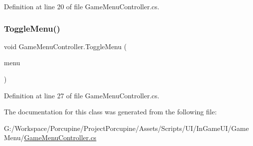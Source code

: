 Definition at line 20 of file Game\+Menu\+Controller.\+cs.

\mbox{\label{class_game_menu_controller_a591baeb9b3e7a3edb590acb91ae224af}} 
\subsubsection{\texorpdfstring{Toggle\+Menu()}{ToggleMenu()}}
{\footnotesize\ttfamily void Game\+Menu\+Controller.\+Toggle\+Menu (\begin{DoxyParamCaption}\item[{Game\+Object}]{menu }\end{DoxyParamCaption})}



Definition at line 27 of file Game\+Menu\+Controller.\+cs.



The documentation for this class was generated from the following file\+:\begin{DoxyCompactItemize}
\item 
G\+:/\+Workspace/\+Porcupine/\+Project\+Porcupine/\+Assets/\+Scripts/\+U\+I/\+In\+Game\+U\+I/\+Game\+Menu/\hyperlink{_game_menu_controller_8cs}{Game\+Menu\+Controller.\+cs}\end{DoxyCompactItemize}
